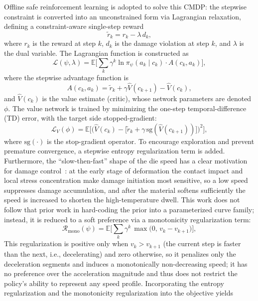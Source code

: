 Offline safe reinforcement learning is adopted to solve this CMDP: the stepwise constraint is converted into an unconstrained form via Lagrangian relaxation, defining a constraint-aware single-step reward
\begin{equation}
\tilde r_k=r_k-\lambda\,d_k,
\end{equation}
where $r_k$ is the reward at step $k$, $d_k$ is the damage violation at step $k$, and $\lambda$ is the dual variable. The Lagrangian function is constructed as
\begin{equation}
\mathcal{L}(\psi,\lambda)=\mathbb{E}\Big[\sum_{k}\gamma^{k}\ln \pi_{\psi}(a_k\mid c_k)\cdot A(c_k,a_k)\Big],
\end{equation}
where the stepwise advantage function is
\begin{equation}
A(c_k,a_k)=\tilde r_k+\gamma\hat{V}(c_{k+1})-\hat{V}(c_k),
\end{equation}
and $\hat{V}(c_k)$ is the value estimate (critic), whose network parameters are denoted $\phi$. The value network is trained by minimizing the one-step temporal-difference (TD) error, with the target side stopped-gradient:
\begin{equation}
\mathcal{L}_{V}(\phi)=\mathbb{E}\Big[\big(\hat{V}(c_k)-\big[\tilde r_k+\gamma\,\mathrm{sg}(\hat{V}(c_{k+1}))\big]\big)^{2}\Big],
\end{equation}
where $\mathrm{sg}(\cdot)$ is the stop-gradient operator. To encourage exploration and prevent premature convergence, a stepwise entropy regularization term is added. Furthermore, the ``slow-then-fast'' shape of the die speed has a clear motivation for damage control~\cite{bambach2018towards}: at the early stage of deformation the contact impact and local stress concentration make damage initiation most sensitive, so a low speed suppresses damage accumulation, and after the material softens sufficiently the speed is increased to shorten the high-temperature dwell. This work does not follow that prior work in hard-coding the prior into a parameterized curve family; instead, it is reduced to a soft preference via a monotonicity regularization term:
\begin{equation}
\mathcal{R}_{\text{mono}}(\psi)=\mathbb{E}\Big[\sum_{k}\gamma^{k}\,\max\big(0,\,v_k-v_{k+1}\big)\Big],
\end{equation}
This regularization is positive only when $v_k>v_{k+1}$ (the current step is faster than the next, i.e., decelerating) and zero otherwise, so it penalizes only the deceleration segments and induces a monotonically non-decreasing speed; it has no preference over the acceleration magnitude and thus does not restrict the policy's ability to represent any speed profile. Incorporating the entropy regularization and the monotonicity regularization into the objective yields
